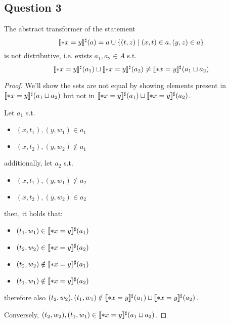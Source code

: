 \subsection{Question 3}
The abstract transformer of the statement
\begin{equation*}
	[\![*x=y]\!]^\sharp(a)=a\cup\{(t,z)\mid(x,t)\in a, (y,z)\in a\}
\end{equation*}
is not distributive, i.e. exists $a_1,a_2\in A$ s.t.
\begin{equation*}
[\![*x=y]\!]^\sharp(a_1)\sqcup[\![*x=y]\!]^\sharp(a_2)\ne[\![*x=y]\!]^\sharp(a_1\sqcup a_2)
\end{equation*}
\begin{proof}
We'll show the sets are not equal by showing elements present in $[\![*x=y]\!]^\sharp(a_1\sqcup a_2)$ but not in $[\![*x=y]\!]^\sharp(a_1)\sqcup[\![*x=y]\!]^\sharp(a_2)$.

Let $a_1$ s.t. 
\begin{itemize}
	\item $(x, t_1), (y, w_1)\in a_1$
	\item $(x, t_2),(y, w_2)\notin a_1$
\end{itemize}
additionally, let $a_2$ s.t.
\begin{itemize}
	\item $(x, t_1), (y, w_1)\notin a_2$ 
	\item $(x, t_2),(y, w_2)\in a_2$
\end{itemize}
then, it holds that:
\begin{itemize}
	\item $(t_1, w_1) \in [\![*x=y]\!]^\sharp(a_1)$
	\item $(t_2, w_2) \in [\![*x=y]\!]^\sharp(a_2)$
	\item $(t_2, w_2) \notin [\![*x=y]\!]^\sharp(a_1)$
	\item $(t_1, w_1) \notin [\![*x=y]\!]^\sharp(a_2)$
\end{itemize}
therefore also $(t_2, w_2),(t_1, w_1)\notin[\![*x=y]\!]^\sharp(a_1)\sqcup[\![*x=y]\!]^\sharp(a_2)$.

Conversely, $(t_2, w_2),(t_1, w_1)\in[\![*x=y]\!]^\sharp(a_1\sqcup a_2)$.
\end{proof}